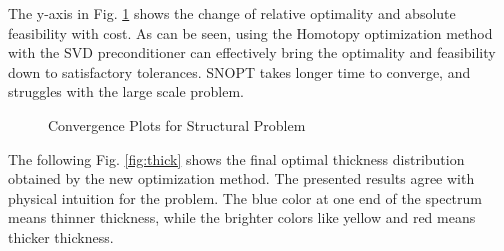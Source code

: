 \documentclass{article}
\theoremstyle{definition}
\begin{document}
The y-axis in Fig. \ref{fig:struct2} shows the change of relative optimality and absolute feasibility with cost. As can be seen, using the Homotopy optimization method with the SVD preconditioner can effectively bring the optimality and feasibility down to satisfactory tolerances. SNOPT takes longer time to converge, and struggles with the large scale problem. 
\begin{figure}[H]
\centering


\caption{Convergence Plots for Structural Problem}
\label{fig:struct2}
\end{figure}

The following Fig. \ref{fig:thick} shows the final optimal thickness distribution obtained by the new optimization method. The presented results agree with physical intuition for the problem. The blue color at one end of the spectrum means thinner thickness, while the brighter colors like yellow and red means thicker thickness.   
\end{document}

